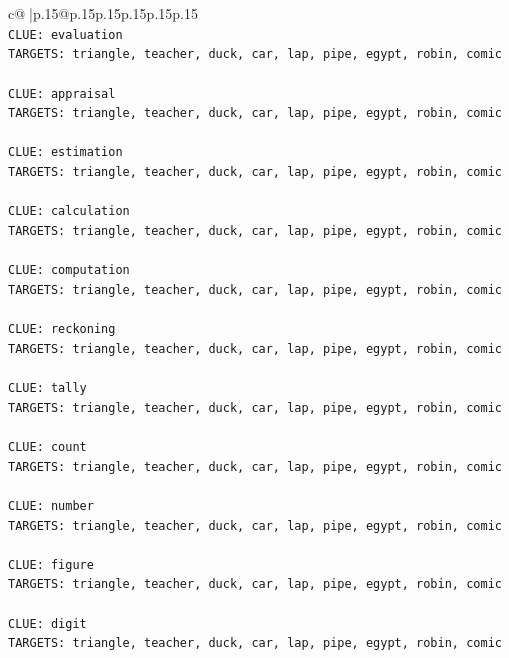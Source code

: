 \documentclass{article}
\begin{document}
{\begin{supertabular}{c@{$\;$}|p{.15\linewidth}@{}p{.15\linewidth}p{.15\linewidth}p{.15\linewidth}p{.15\linewidth}p{.15\linewidth}}
{{{\\ 
\texttt{CLUE: evaluation} \\
\texttt{TARGETS: triangle, teacher, duck, car, lap, pipe, egypt, robin, comic} \\
\\ 
\texttt{CLUE: appraisal} \\
\texttt{TARGETS: triangle, teacher, duck, car, lap, pipe, egypt, robin, comic} \\
\\ 
\texttt{CLUE: estimation} \\
\texttt{TARGETS: triangle, teacher, duck, car, lap, pipe, egypt, robin, comic} \\
\\ 
\texttt{CLUE: calculation} \\
\texttt{TARGETS: triangle, teacher, duck, car, lap, pipe, egypt, robin, comic} \\
\\ 
\texttt{CLUE: computation} \\
\texttt{TARGETS: triangle, teacher, duck, car, lap, pipe, egypt, robin, comic} \\
\\ 
\texttt{CLUE: reckoning} \\
\texttt{TARGETS: triangle, teacher, duck, car, lap, pipe, egypt, robin, comic} \\
\\ 
\texttt{CLUE: tally} \\
\texttt{TARGETS: triangle, teacher, duck, car, lap, pipe, egypt, robin, comic} \\
\\ 
\texttt{CLUE: count} \\
\texttt{TARGETS: triangle, teacher, duck, car, lap, pipe, egypt, robin, comic} \\
\\ 
\texttt{CLUE: number} \\
\texttt{TARGETS: triangle, teacher, duck, car, lap, pipe, egypt, robin, comic} \\
\\ 
\texttt{CLUE: figure} \\
\texttt{TARGETS: triangle, teacher, duck, car, lap, pipe, egypt, robin, comic} \\
\\ 
\texttt{CLUE: digit} \\
\texttt{TARGETS: triangle, teacher, duck, car, lap, pipe, egypt, robin, comic} \\
\\ 
}}}
\end{supertabular}}
\end{document}
